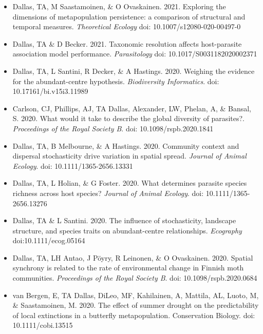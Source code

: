 \documentclass[]{CV}
\begin{document}
\begin{itemize}
\item {\mefont Dallas, TA}, M Saastamoinen, \& O Ovaskainen. 2021. Exploring the dimensions of metapopulation persistence: a comparison of structural and temporal measures. \textit{Theoretical Ecology} doi: 10.1007/s12080-020-00497-0 

\item {\mefont Dallas, TA} \& D Becker. 2021. Taxonomic resolution affects host-parasite association model performance. \textit{Parasitology} doi: 10.1017/S0031182020002371
\end{itemize}




{}

\begin{itemize}

\item {\mefont Dallas, TA}, L Santini, R Decker, \& A Hastings. 2020. Weighing the evidence for the abundant-centre hypothesis. \textit{Biodiversity Informatics}. doi: 10.17161/bi.v15i3.11989 

\item Carlson, CJ, Phillips, AJ, {\mefont TA Dallas}, Alexander, LW, Phelan, A, \& Bansal, S. 2020. What would it take to describe the global diversity of parasites?. \textit{Proceedings of the Royal Society B}. doi: 10.1098/rspb.2020.1841

\item {\mefont Dallas, TA}, B Melbourne, \& A Hastings. 2020. Community context and dispersal stochasticity drive variation in spatial spread. \textit{Journal of Animal Ecology}. doi: 10.1111/1365-2656.13331

\item {\mefont Dallas, TA}, L Holian, \& G Foster. 2020. What determines parasite species richness across host species? \textit{Journal of Animal Ecology}. doi: 10.1111/1365-2656.13276

\item {\mefont Dallas, TA} \& L Santini. 2020. The influence of stochasticity, landscape structure, and species traits on abundant-centre relationships. \textit{Ecography} doi:10.1111/ecog.05164

\item {\mefont Dallas, TA}, LH Antao, J Pöyry, R Leinonen, \& O Ovaskainen. 2020. Spatial synchrony is related to the rate of environmental change in Finnish moth communities. \textit{Proceedings of the Royal Society B}. doi: 10.1098/rspb.2020.0684

\item van Bergen, E, {\mefont TA Dallas}, DiLeo, MF, Kahilainen, A, Mattila, AL, Luoto, M, \& Saastamoinen, M. 2020. The effect of summer drought on the predictability of local extinctions in a butterfly metapopulation. Conservation Biology. doi: 10.1111/cobi.13515


\end{itemize}
\end{document}
